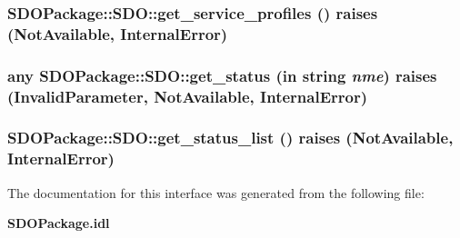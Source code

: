 \subsubsection[{get\_\-service\_\-profiles}]{ SDOPackage::SDO::get\_\-service\_\-profiles ()  raises (NotAvailable, InternalError)}\label{interfaceSDOPackage_1_1SDO_af455c384fa54ab6872d28db1baec3a1d}
\subsubsection[{get\_\-status}]{\setlength{\rightskip}{0pt plus 5cm}any SDOPackage::SDO::get\_\-status (in string {\em nme})  raises (InvalidParameter, NotAvailable, InternalError)}\label{interfaceSDOPackage_1_1SDO_a2655f624a38b590593154c8a8c11e6e8}
\subsubsection[{get\_\-status\_\-list}]{ SDOPackage::SDO::get\_\-status\_\-list ()  raises (NotAvailable, InternalError)}\label{interfaceSDOPackage_1_1SDO_ae019ba73a5675a871701153bc56db14c}


The documentation for this interface was generated from the following file:\begin{DoxyCompactItemize}
\item 
{\bf SDOPackage.idl}\end{DoxyCompactItemize}
